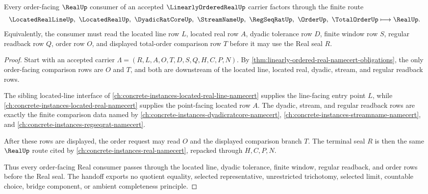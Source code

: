 \begin{theorem}
\label{thm:linearly-ordered-real-located-order-handoff}
Every order-facing $\RealUp$ consumer of an accepted $\LinearlyOrderedRealUp$ carrier factors through the finite route
$$
\LocatedRealLineUp,\ \LocatedRealUp,\ \DyadicRatCoreUp,\ \StreamNameUp,\ \RegSeqRatUp,\ \OrderUp,\ \TotalOrderUp
\longmapsto
\RealUp .
$$
Equivalently, the consumer must read the located line row $L$, located real row $A$, dyadic tolerance row $D$, finite window row $S$, regular readback row $Q$, order row $O$, and displayed total-order comparison row $T$ before it may use the Real seal $R$.
\end{theorem}
\begin{proof}
Start with an accepted carrier $\Lambda=(R,L,A,O,T,D,S,Q,H,C,P,N)$. By \autoref{thm:linearly-ordered-real-namecert-obligations}, the only order-facing comparison rows are $O$ and $T$, and both are downstream of the located line, located real, dyadic, stream, and regular readback rows.

The sibling located-line interface of \autoref{ch:concrete-instances-located-real-line-namecert} supplies the line-facing entry point $L$, while \autoref{ch:concrete-instances-located-real-namecert} supplies the point-facing located row $A$. The dyadic, stream, and regular readback rows are exactly the finite comparison data named by \autoref{ch:concrete-instances-dyadicratcore-namecert}, \autoref{ch:concrete-instances-streamname-namecert}, and \autoref{ch:concrete-instances-regseqrat-namecert}.

After these rows are displayed, the order request may read $O$ and the displayed comparison branch $T$. The terminal seal $R$ is then the same $\RealUp$ route cited by \autoref{ch:concrete-instances-real-namecert}, repacked through $H,C,P,N$.

Thus every order-facing Real consumer passes through the located line, dyadic tolerance, finite window, regular readback, and order rows before the Real seal. The handoff exports no quotient equality, selected representative, unrestricted trichotomy, selected limit, countable choice, bridge component, or ambient completeness principle.
\end{proof}


